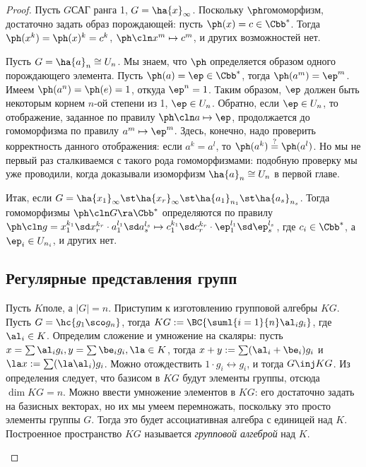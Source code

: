 \documentclass[a4paper]{article}
\begin{document}
\begin{proof}
 Пусть $G$\т САГ ранга 1,  $G = \ha{x}_\infty$. Поскольку $\ph$\т  гомоморфизм, достаточно задать
образ порождающей: пусть $\ph(x) = c \in \Cbb^*$. Тогда $\ph(x^k)=\ph(x)^k = c^k$,  $\ph\cln x^m \mapsto
c^m$, и других возможностей нет.

 Пусть $G = \ha{a}_n \cong U_n$. Мы знаем, что $\ph$ определяется  образом одного порождающего
элемента. Пусть $\ph(a) =\ep \in \Cbb^*$, тогда $\ph(a^m)=\ep^m$. Имеем $\ph(a^n)=\ph(e)=1$, откуда
$\ep^n=1$. Таким образом, $\ep$ должен быть некоторым корнем $n$-ой степени из 1,  $\ep \in U_n$.
Обратно, если $\ep \in U_n$, то отображение, заданное по правилу $\ph\cln a \mapsto \ep$, продолжается до
гомоморфизма по правилу $a^m \mapsto \ep^m$. Здесь, конечно, надо проверить корректность данного отображения:
если $a^k=a^l$, то $\ph(a^k)\overset{?}{=}\ph(a^l)$. Но мы не первый раз сталкиваемся с такого рода
гомоморфизмами: подобную проверку мы уже проводили, когда доказывали изоморфизм $\ha{a}_n \cong U_n$ в первой
главе.

Итак, если $G = \ha{x_1}_\infty\st \ha{x_r}_\infty\st\ha{a_1}_{n_1}\st \ha{a_s}_{n_s}$.  Тогда гомоморфизмы
$\ph\cln G \ra \Cbb^*$ определяются по правилу $\ph\cln g = x_1^{k_1}\sd x_r^{k_r}\cdot a_1^{l_1}\sd a_s^{l_s}
\mapsto c_1^{k_1}\sd c_r^{k_r}\cdot\ep_1^{l_1}\sd \ep_s^{l_s}$, где $c_i \in \Cbb^*$, а $\ep_i \in U_{n_i}$,
и других нет.

\subsection{Регулярные представления групп}

\begin{df}
Пусть $K$\т поле, а $|G| = n$. Приступим к изготовлению групповой алгебры $KG$. Пусть $G = \hc{g_1\sco g_n}$, тогда $KG
:= \BC{\suml{i=1}{n}\al_ig_i}$, где $\al_i \in K$. Определим сложение и умножение на скаляры: пусть $x = \sum
\al_i g_i, y = \sum \be_i g_i, \la \in K$, тогда $x + y := \sum(\al_i + \be_i)g_i$ и $\la x := \sum (\la
\al_i) g_i$. Можно отождествить $1 \cdot g_i \leftrightarrow g_i$, и тогда $G \inj KG$. Из определения
следует, что базисом в $KG$ будут элементы группы, отсюда $\dim KG = n$. Можно ввести умножение элементов в
$KG$: его достаточно задать на базисных векторах, но их мы умеем перемножать, поскольку это просто элементы
группы $G$. Тогда это будет ассоциативная алгебра с единицей над $K$. Построенное пространство $KG$
называется \emph{групповой алгеброй} над $K$.
\end{df}


\end{proof}
\end{document}
